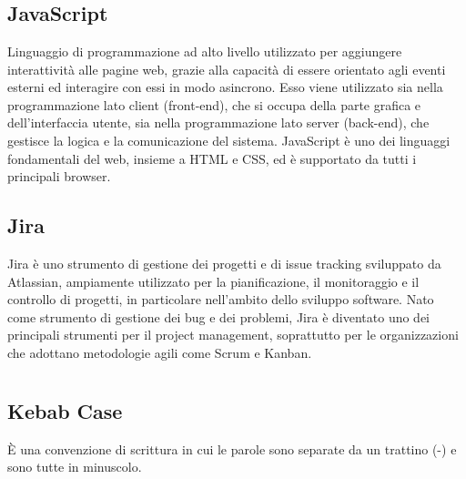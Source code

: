 
\section{}

\hypertarget{sec:javascript}{}
\subsection*{JavaScript}
Linguaggio di programmazione ad alto livello utilizzato per aggiungere interattività alle pagine web, grazie alla capacità di essere
orientato agli eventi esterni ed interagire con essi in modo asincrono. Esso viene utilizzato sia nella programmazione lato client
(front-end), che si occupa della parte grafica e dell’interfaccia utente, sia nella programmazione lato server (back-end), che
gestisce la logica e la comunicazione del sistema. JavaScript è uno dei linguaggi fondamentali del web, insieme a HTML e CSS, ed
è supportato da tutti i principali browser.

\subsection*{Jira}
Jira è uno strumento di gestione dei progetti e di issue tracking sviluppato da Atlassian, ampiamente utilizzato per la pianificazione, il monitoraggio e 
il controllo di progetti, in particolare nell'ambito dello sviluppo software. Nato come strumento di gestione dei bug e dei problemi, Jira è diventato uno 
dei principali strumenti per il project management, soprattutto per le organizzazioni che adottano metodologie agili come Scrum e Kanban.

\newpage



\section{}

\hypertarget{sec:Kebab Case}{}
\subsection*{Kebab Case}
È una convenzione di scrittura in cui le parole sono separate da un trattino (-) e sono tutte in minuscolo.

\newpage



